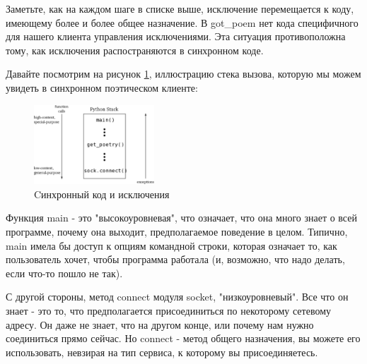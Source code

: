 Заметьте, как на каждом шаге в списке выше, 
исключение перемещается к коду, имеющему более и более  
общее назначение. В got\_poem нет кода специфичного для нашего 
клиента управления исключениями. Эта ситуация противоположна тому, как
исключения распостраняются в синхронном коде.


Давайте посмотрим на рисунок \ref{fig:sync-exceptions}, 
иллюстрацию стека вызова, которую мы можем увидеть в 
синхронном поэтическом клиенте:

\begin{figure}[h]
\begin{center}
    \includegraphics[width=0.4\textwidth]{images/sync-exceptions.pdf}
    \caption{Cинхронный код и исключения\label{fig:sync-exceptions}}
\end{center}
\end{figure}


Функция main - это "высокоуровневая", что означает, что она 
много знает о всей программе, почему она выходит, предполагаемое 
поведение в целом. Типично, main имела бы доступ к опциям командной 
строки, которая означает то, как пользователь хочет, чтобы 
программа работала (и, возможно, что надо делать, если что-то 
пошло не так).
 

С другой стороны, метод connect модуля socket, "низкоуровневый". 
Все что он знает - это то, что предполагается присоединиться по 
некоторому сетевому адресу. Он даже не знает, что на другом конце, или 
почему нам нужно соединиться прямо сейчас. Но connect - метод общего 
назначения, вы можете его использовать, невзирая на тип сервиса, к 
которому вы присоединяетесь.



